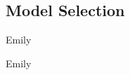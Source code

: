 \documentclass{beamer}\usepackage[]{graphicx}\usepackage[]{color}
\begin{document}

\subsection{Model Selection}

\begin{frame}{Emily}

\end{frame}


\begin{frame}{Emily}

\end{frame}

\end{document}
